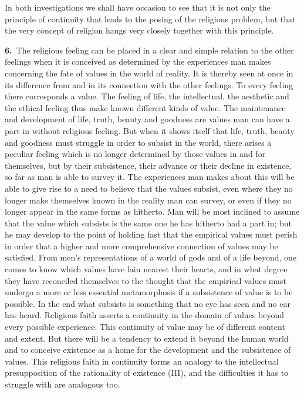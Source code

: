 \documentclass[12pt,a4paper]{book}
\newcommand{\opage}[1]{\marginnote{\footnotesize\textit{[#1]}}}
\begin{document}
In both investigations we shall have occasion to see that it is not only the
principle of continuity that leads to the posing of the religious problem, but
that the very concept of religion hangs very closely together with this
principle.

\noindent\textbf{6.}~The religious feeling can be placed in a clear and simple
relation to the other feelings when it is conceived as determined by the
experiences man makes concerning the fate of values in the world of reality. It
is thereby seen at once in its difference from and in its connection with the
other feelings. To every feeling there corresponds a value. The feeling of life,
the intellectual, the aesthetic and the ethical feeling thus make known different
kinds of value. The maintenance and development of life, truth, beauty and
goodness are values man can have a part in without religious feeling. But when it
shows itself that life, truth, beauty and goodness must struggle in order to
subsist in the world, there arises a peculiar feeling which is no longer
determined by those values in and for themselves, but by their subsistence, their
advance or their decline in existence, so far as man is able to survey it. The
experiences man makes about this will be able to give rise to a need to believe
that the values subsist, even where they no longer make themselves known in the
reality man can survey, or even if they no longer appear in the same forms as
hitherto. Man will be most inclined to assume that the value which subsists is
the same one he has hitherto had a part in; but he may develop to the point of
holding fast that the empirical values must perish in order that a higher and
more comprehensive connection of values may be satisfied. From men's
representations of a world of gods and of a life beyond, one comes to know which
values have lain nearest their hearts, and in what degree they have reconciled
themselves to the thought that the empirical values must undergo a more or less
essential metamorphosis \opage{81}if a subsistence of value is to be possible. In the end
what subsists is something that no eye has seen and no ear has heard. Religious
faith asserts a continuity in the domain of values beyond every possible
experience. This continuity of value may be of different content and extent. But
there will be a tendency to extend it beyond the human world and to conceive
existence as a home for the development and the subsistence of values. This
religious faith in continuity forms an analogy to the intellectual presupposition
of the rationality of existence (III), and the difficulties it has to struggle
with are analogous too.
\end{document}
